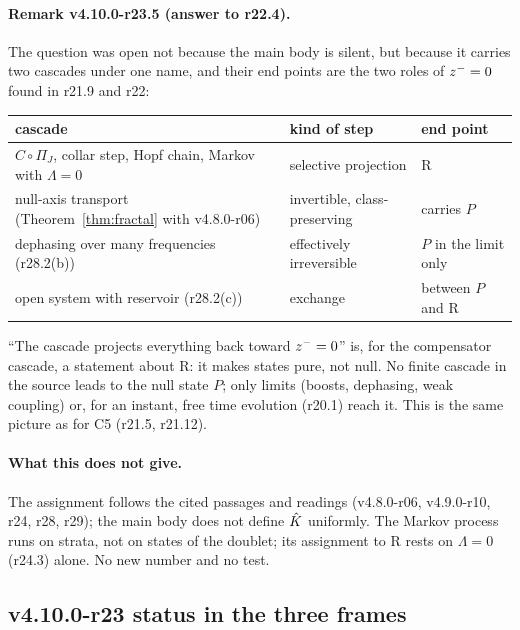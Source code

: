 \paragraph{Remark v4.10.0-r23.5 (answer to r22.4).}
The question was open not because the main body is silent, but because it carries two cascades under one name, and their end points
are the two roles of \(z^-=0\) found in r21.9 and r22:
\begin{center}
\small
\begin{tabular}{@{}>{\raggedright\arraybackslash}p{}>{\raggedright\arraybackslash}p{}>{\raggedright\arraybackslash}p{}@{}}
\toprule
cascade & kind of step & end point\\
\midrule
\(C\circ\Pi_J\), collar step, Hopf chain, Markov with \(\Lambda=0\) & selective projection & R\\
null-axis transport (Theorem~\ref{thm:fractal} with v4.8.0-r06) & invertible, class-preserving & carries \(P\)\\
dephasing over many frequencies (r28.2(b)) & effectively irreversible & \(P\) in the limit only\\
open system with reservoir (r28.2(c)) & exchange & between \(P\) and R\\
\bottomrule
\end{tabular}
\end{center}
``The cascade projects everything back toward \(z^-=0\)'' is, for the compensator cascade, a statement about R: it makes states
pure, not null.  No finite cascade in the source leads to the null state \(P\); only limits (boosts, dephasing, weak coupling) or, for an
instant, free time evolution (r20.1) reach it.  This is the same picture as for C5 (r21.5, r21.12).

\paragraph{What this does not give.}
The assignment follows the cited passages and readings (v4.8.0-r06, v4.9.0-r10, r24, r28, r29); the main body does not define \(\hat{K}\)
uniformly.  The Markov process runs on strata, not on states of the doublet; its assignment to R rests on \(\Lambda=0\) (r24.3) alone.  No
new number and no test.

\subsection*{v4.10.0-r23 status in the three frames}
\label{subsec:v4100-r23-frames}

